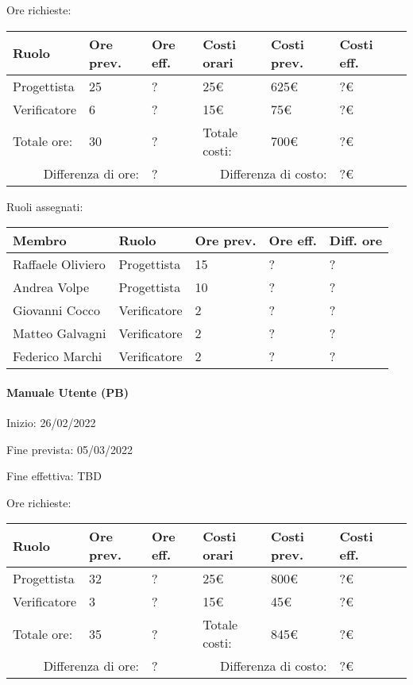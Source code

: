 \documentclass[a4paper, 12pt]{article}
\begin{document}
Ore richieste:\\[0.5em]
\begin{tabular}{|l|l|l||l|l|l|l|}\hline
Ruolo & Ore prev. & Ore eff. & Costi orari & Costi prev. & Costi eff.\\\hline
Progettista & 25 & ? & 25\euro & 625\euro & ?\euro \\\hline
Verificatore & 6 & ? & 15\euro & 75\euro & ?\euro \\\hline
Totale ore: & 30 & ? & Totale costi: & 700\euro & ?\euro \\\hline
\multicolumn{2}{|r|}{Differenza di ore:} & ? & \multicolumn{2}{r|}{Differenza di costo:} & ?\euro \\\hline
\end{tabular}

Ruoli assegnati:\\[0.5em]
\begin{tabular}{|l|l|l|l|l|}\hline
Membro & Ruolo & Ore prev. & Ore eff. & Diff. ore \\\hline
Raffaele Oliviero & Progettista & 15 & ? & ? \\\hline
Andrea Volpe & Progettista & 10 & ? & ? \\\hline
Giovanni Cocco & Verificatore & 2 & ? & ? \\\hline
Matteo Galvagni & Verificatore & 2 & ? & ? \\\hline
Federico Marchi & Verificatore & 2 & ? & ? \\\hline
\end{tabular}

\paragraph{Manuale Utente (PB)}
Inizio: 26/02/2022\par
Fine prevista: 05/03/2022\par
Fine effettiva: TBD

Ore richieste:\\[0.5em]
\begin{tabular}{|l|l|l||l|l|l|l|}\hline
Ruolo & Ore prev. & Ore eff. & Costi orari & Costi prev. & Costi eff.\\\hline
Progettista & 32 & ? & 25\euro & 800\euro & ?\euro \\\hline
Verificatore & 3 & ? & 15\euro & 45\euro & ?\euro \\\hline
Totale ore: & 35 & ? & Totale costi: & 845\euro & ?\euro \\\hline
\multicolumn{2}{|r|}{Differenza di ore:} & ? & \multicolumn{2}{r|}{Differenza di costo:} & ?\euro \\\hline
\end{tabular}
\end{document}
